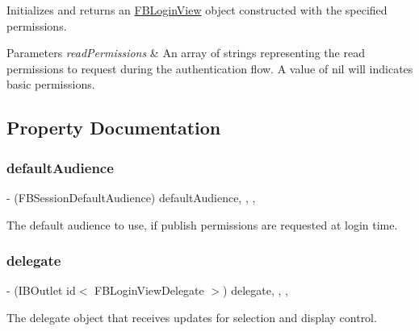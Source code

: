 Initializes and returns an {\ttfamily \hyperlink{interfaceFBLoginView}{F\+B\+Login\+View}} object constructed with the specified permissions.


\begin{DoxyParams}{Parameters}
{\em read\+Permissions} & An array of strings representing the read permissions to request during the authentication flow. A value of nil will indicates basic permissions. \\
\hline
\end{DoxyParams}


\subsection{Property Documentation}
\mbox{\label{interfaceFBLoginView_a45fcbc4c198a06b34ed090d84d0fe24f}} 
\subsubsection{\texorpdfstring{default\+Audience}{defaultAudience}}
{\footnotesize\ttfamily -\/ (F\+B\+Session\+Default\+Audience) default\+Audience\hspace{0.3cm}{\ttfamily [read]}, {\ttfamily [write]}, {\ttfamily [nonatomic]}, {\ttfamily [assign]}}

The default audience to use, if publish permissions are requested at login time. \mbox{\label{interfaceFBLoginView_abb654662b04ca4d0741b024870593d2e}} 
\subsubsection{\texorpdfstring{delegate}{delegate}}
{\footnotesize\ttfamily -\/ (I\+B\+Outlet id$<$ F\+B\+Login\+View\+Delegate $>$) delegate\hspace{0.3cm}{\ttfamily [read]}, {\ttfamily [write]}, {\ttfamily [nonatomic]}, {\ttfamily [assign]}}

The delegate object that receives updates for selection and display control. \mbox{\label{interfaceFBLoginView_aa9bf2f39b651809b2309803ea0d54bb1}} 
